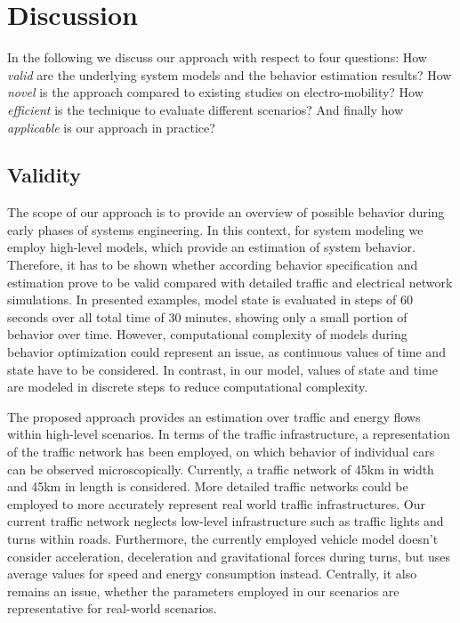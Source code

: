 \section{Discussion}
\label{section:discussion}

In the following we discuss our approach with respect to four questions: How \textit{valid} are the underlying system models and the behavior estimation results? How \textit{novel} is the approach compared to existing studies on electro-mobility? How \textit{efficient} is the technique to evaluate different scenarios? And finally how \textit{applicable} is our approach in practice?

\subsection{Validity}

The scope of our approach is to provide an overview of possible behavior during early phases of systems engineering. In this context, for system modeling we employ high-level models, which provide an estimation of system behavior. Therefore, it has to be shown whether according behavior specification and estimation prove to be valid compared with detailed traffic and electrical network simulations. In presented examples, model state is evaluated in steps of 60 seconds over all total time of 30 minutes, showing only a small portion of behavior over time. However, computational complexity of models during behavior optimization could represent an issue, as continuous values of time and state have to be considered. In contrast, in our model, values of state and time are modeled in discrete steps to reduce computational complexity.

The proposed approach provides an estimation over traffic and energy flows within high-level scenarios. In terms of the traffic infrastructure, a representation of the traffic network has been employed, on which behavior of individual cars can be observed microscopically. Currently, a traffic network of 45km in width and 45km in length is considered. More detailed traffic networks could be employed to more accurately represent real world traffic infrastructures. Our current traffic network neglects low-level infrastructure such as traffic lights and turns within roads. Furthermore, the currently employed vehicle model doesn't consider acceleration, deceleration and gravitational forces during turns, but uses average values for speed and energy consumption instead. Centrally, it also remains an issue, whether the parameters employed in our scenarios are representative for real-world scenarios.

